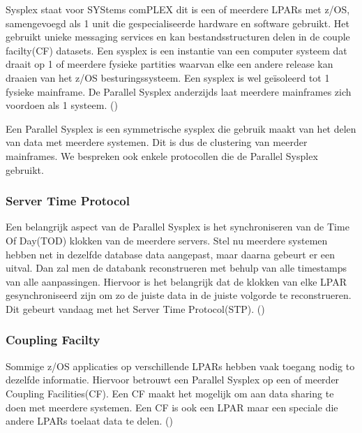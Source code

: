 Sysplex staat voor SYStems comPLEX dit is een of meerdere LPARs met z/OS, samengevoegd als 1 unit die gespecialiseerde hardware en software gebruikt. Het gebruikt unieke messaging services en kan bestandsstructuren delen in de couple facilty(CF) datasets. Een sysplex is een instantie van een computer systeem dat draait op 1 of meerdere fysieke partities waarvan elke een andere release kan draaien van het z/OS besturingssysteem. Een sysplex is wel geïsoleerd tot 1 fysieke mainframe. De Parallel Sysplex anderzijds laat meerdere mainframes zich voordoen als 1 systeem. (\cite{Ebbers2011}) 

Een Parallel Sysplex is een symmetrische sysplex die gebruik maakt van het delen van data met meerdere systemen. Dit is dus de clustering van meerder mainframes. We bespreken ook enkele protocollen die de Parallel Sysplex gebruikt. 

\subsubsection{Server Time Protocol}
\label{subsubsec:Server Time Protocol}

Een belangrijk aspect van de Parallel Sysplex is het synchroniseren van de Time Of Day(TOD) klokken van de meerdere servers. Stel nu meerdere systemen hebben net in dezelfde database data aangepast, maar daarna gebeurt er een uitval. Dan zal men de databank reconstrueren met behulp van alle timestamps van alle aanpassingen. Hiervoor is het belangrijk dat de klokken van elke LPAR gesynchroniseerd zijn om zo de juiste data in de juiste volgorde te reconstrueren. Dit gebeurt vandaag met het Server Time Protocol(STP). (\cite{Ebbers2011})

\subsubsection{Coupling Facilty}
\label{subsubsec:Coupling Facility}

Sommige z/OS applicaties op verschillende LPARs hebben vaak toegang nodig to dezelfde informatie. Hiervoor betrouwt een Parallel Sysplex op een of meerder Coupling Facilities(CF). Een CF maakt het mogelijk om aan data sharing te doen met meerdere systemen. Een CF is ook een LPAR maar een speciale die andere LPARs toelaat data te delen. (\cite{Ebbers2011})

